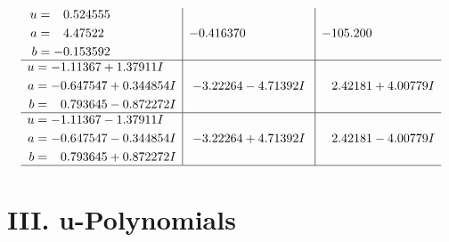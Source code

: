 \documentclass[1p]{elsarticle_modified}
\theoremstyle{definition}
\begin{document}
$$\begin{array}{c|c|c}
\begin{aligned}
u &= \phantom{-}0.524555\phantom{ +0.000000I} \\
a &= \phantom{-}4.47522\phantom{ +0.000000I} \\
b &= -0.153592\phantom{ +0.000000I}\end{aligned}
 & -0.416370\phantom{ +0.000000I} & -105.200\phantom{ +0.000000I} \\ \hline\begin{aligned}
u &= -1.11367 + 1.37911 I \\
a &= -0.647547 + 0.344854 I \\
b &= \phantom{-}0.793645 - 0.872272 I\end{aligned}
 & -3.22264 - 4.71392 I & \phantom{-}2.42181 + 4.00779 I \\ \hline\begin{aligned}
u &= -1.11367 - 1.37911 I \\
a &= -0.647547 - 0.344854 I \\
b &= \phantom{-}0.793645 + 0.872272 I\end{aligned}
 & -3.22264 + 4.71392 I & \phantom{-}2.42181 - 4.00779 I\\
 \hline 
 \end{array}$$\newpage
\newpage\renewcommand{\arraystretch}{1}
\centering \section*{ III. u-Polynomials}
\end{document}
